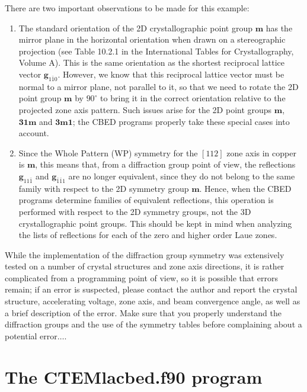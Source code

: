 \documentclass[DIV=calc, paper=letter, fontsize=11pt]{scrartcl}	 %
\begin{document}
There are two important observations to be made for this example:  
\begin{enumerate}
	\item The standard orientation of the 2D crystallographic point group $\mathbf{m}$ has the mirror plane in the horizontal 
	orientation when drawn on a stereographic projection (see Table 10.2.1 in the International Tables for Crystallography, Volume A).
	This is the same orientation as the shortest reciprocal lattice vector $\mathbf{g}_{1\bar{1}0}$.  However, we know that this 
	reciprocal lattice vector must be normal to a mirror plane, not parallel to it, so that we need to rotate the 2D point group
	$\mathbf{m}$ by $90^{\circ}$ to bring it in the correct orientation relative to the projected zone axis pattern.  Such issues
	arise for the 2D point groups $\mathbf{m}$, $\mathbf{31m}$ and $\mathbf{3m1}$; the CBED programs properly take 
	these special cases into account.

	\item Since the Whole Pattern (WP) symmetry for the $[112]$ zone axis in copper is $\mathbf{m}$, this means that,
	from a diffraction group point of view, the reflections $\mathbf{g}_{11\bar{1}}$ and $\mathbf{g}_{\bar{1}\bar{1}1}$ are
	no longer equivalent, since they do not belong to the same family with respect to the 2D symmetry group $\mathbf{m}$.
	Hence, when the CBED programs determine families of equivalent reflections, this operation is performed with respect
	to the 2D symmetry groups, not the 3D crystallographic point groups.  This should be kept in mind when analyzing the lists 
	of reflections for each of the zero and higher order Laue zones.
\end{enumerate}

While the implementation of the diffraction group symmetry was extensively tested on a number of crystal structures and 
zone axis directions, it is rather complicated from a programming point of view, so it is possible that errors remain; if an error is suspected, please contact the 
author and report the crystal structure, accelerating voltage, zone axis, and beam convergence angle, as well as a brief description of the 
error.  Make sure that you properly understand the diffraction groups and the use of the symmetry tables before complaining 
about a potential error$\ldots$.



\newpage
\section{The \protect\textsf{CTEMlacbed.f90} program\label{sec:f90lacbed}}
\end{document}
